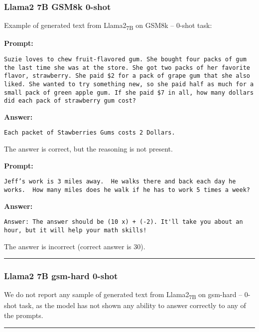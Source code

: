 \subsubsection*{Llama2 7B GSM8k 0-shot}
\noindent Example of generated text from Llama2\textsubscript{7B} on GSM8k -- 0-shot task:
\begin{displayquote}
	\textbf{Prompt:}
	\begin{Verbatim}[fontsize=\small,breaklines]
Suzie loves to chew fruit-flavored gum. She bought four packs of gum the last time she was at the store. She got two packs of her favorite flavor, strawberry. She paid $2 for a pack of grape gum that she also liked. She wanted to try something new, so she paid half as much for a small pack of green apple gum. If she paid $7 in all, how many dollars did each pack of strawberry gum cost?
	\end{Verbatim}
	\textbf{Answer:}
	\begin{Verbatim}[fontsize=\small,breaklines]
Each packet of Stawberries Gums costs 2 Dollars.
	\end{Verbatim}
\end{displayquote}
The answer is correct, but the reasoning is not present.
\begin{displayquote}
	\textbf{Prompt:}
	\begin{Verbatim}[fontsize=\small,breaklines]
Jeff’s work is 3 miles away.  He walks there and back each day he works.  How many miles does he walk if he has to work 5 times a week?
	\end{Verbatim}
	\textbf{Answer:}
	\begin{Verbatim}[fontsize=\small,breaklines]
Answer: The answer should be (10 x) + (-2). It'll take you about an hour, but it will help your math skills!
	\end{Verbatim}
\end{displayquote}
The answer is incorrect (correct answer is 30).

\noindent\rule{\textwidth}{0.4pt}

\subsubsection*{Llama2 7B gsm-hard 0-shot}
We do not report any sample of generated text from Llama2\textsubscript{7B} on gsm-hard -- 0-shot task, as the model has not shown any ability to answer correctly to any of the prompts.

\noindent\rule{\textwidth}{0.4pt}

